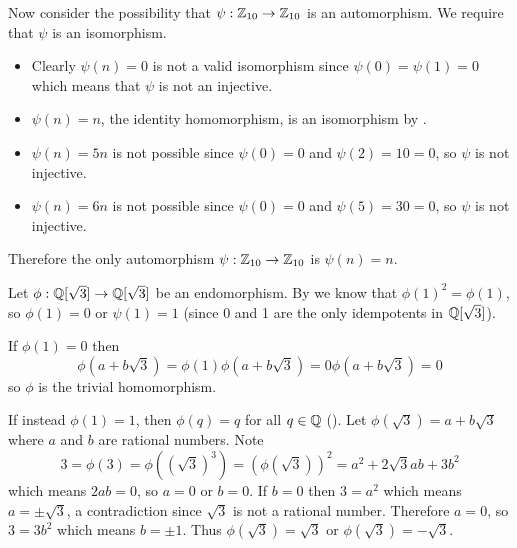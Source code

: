 \begin{questions}
    Now consider the possibility that $\psi: \mathbb{Z}_{10} \to \mathbb{Z}_{10}$ is an automorphism. We require that $\psi$ is an isomorphism.
    \begin{itemize}
        \item Clearly $\psi(n) = 0$ is not a valid isomorphism since $\psi(0) = \psi(1) = 0$ which means that $\psi$ is not an injective.
        \item $\psi(n) = n$, the identity homomorphism, is an isomorphism by .
        \item $\psi(n) = 5n$ is not possible since $\psi(0) = 0$ and $\psi(2) = 10 = 0$, so $\psi$ is not injective.
        \item $\psi(n) = 6n$ is not possible since $\psi(0) = 0$ and $\psi(5) = 30 = 0$, so $\psi$ is not injective.
    \end{itemize}
    Therefore the only automorphism $\psi:\mathbb{Z}_{10} \to \mathbb{Z}_{10}$ is $\psi(n) = n$.

    \item Let $\phi: \mathbb{Q}[\sqrt3] \to \mathbb{Q}[\sqrt3]$ be an endomorphism. By  we know that $\phi(1)^2 = \phi(1)$, so $\phi(1) = 0$ or $\psi(1) = 1$ (since 0 and 1 are the only idempotents in $\mathbb{Q}[\sqrt3]$).
    
    If $\phi(1) = 0$ then
    \[
        \phi(a+b\sqrt3) = \phi(1)\phi(a+b\sqrt3) = 0\phi(a+b\sqrt3) = 0
    \]
    so $\phi$ is the trivial homomorphism.

    If instead $\phi(1) = 1$, then $\phi(q) = q$ for all $q \in \mathbb{Q}$ (). Let $\phi(\sqrt3) = a+b\sqrt3$ where $a$ and $b$ are rational numbers. Note
    \[
        3 = \phi(3) = \phi((\sqrt3)^3) = \left(\phi(\sqrt3)\right)^2 = a^2+2\sqrt3ab+3b^2
    \]
    which means $2ab = 0$, so $a = 0$ or $b = 0$. If $b = 0$ then $3 = a^2$ which means $a = \pm\sqrt3$, a contradiction since $\sqrt3$ is not a rational number. Therefore $a = 0$, so $3 = 3b^2$ which means $b = \pm1$. Thus $\phi(\sqrt3) = \sqrt3$ or $\phi(\sqrt3) = -\sqrt3$.


\end{questions}
